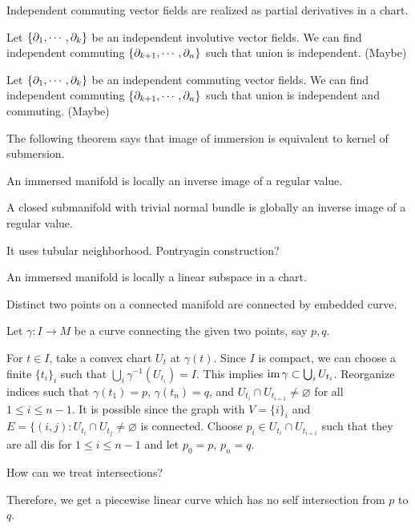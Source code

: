 \documentclass[a4paper]{article}
\begin{document}
\begin{prop}
Independent commuting vector fields are realized as partial derivatives in a chart.
\end{prop}

\begin{prop}
Let $\{\pd_1,\cdots,\pd_k\}$ be an independent involutive vector fields.
We can find independent commuting $\{\pd_{k+1},\cdots,\pd_n\}$ such that union is independent.
(Maybe)
\end{prop}
\begin{prop}
Let $\{\pd_1,\cdots,\pd_k\}$ be an independent commuting vector fields.
We can find independent commuting $\{\pd_{k+1},\cdots,\pd_n\}$ such that union is independent and commuting.
(Maybe)
\end{prop}

\bigskip



The following theorem says that image of immersion is equivalent to kernel of submersion.
\begin{prop}
An immersed manifold is locally an inverse image of a regular value.
\end{prop}

\begin{prop}
A closed submanifold with trivial normal bundle is globally an inverse image of a regular value.
\end{prop}
\begin{pf}
It uses tubular neighborhood.
Pontryagin construction?
\end{pf}

\begin{prop}
An immersed manifold is locally a linear subspace in a chart.
\end{prop}

\begin{prop}
Distinct two points on a connected manifold are connected by embedded curve.
\end{prop}
\begin{pf}
Let $\gamma:I\to M$ be a curve connecting the given two points, say $p,q$.

For $t\in I$, take a convex chart $U_t$ at $\gamma(t)$.
Since $I$ is compact, we can choose a finite $\{t_i\}_i$ such that $\bigcup_i\gamma^{-1}(U_{t_i})=I$.
This implies $\operatorname{im}\gamma\subset\bigcup_iU_{t_i}$.
Reorganize indices such that $\gamma(t_1)=p$, $\gamma(t_n)=q$, and $U_{t_i}\cap U_{t_{i+1}}\ne\varnothing$ for all $1\le i\le n-1$.
It is possible since the graph with $V=\{i\}_i$ and $E=\{(i,j):U_{t_i}\cap U_{t_j}\ne\varnothing$ is connected.
Choose $p_i\in U_{t_i}\cap U_{t_{i+1}}$ such that they are all dis for $1\le i\le n-1$ and let $p_0=p$, $p_n=q$.

How can we treat intersections?

Therefore, we get a piecewise linear curve which has no self intersection from $p$ to $q$.

\end{pf}
\end{document}
